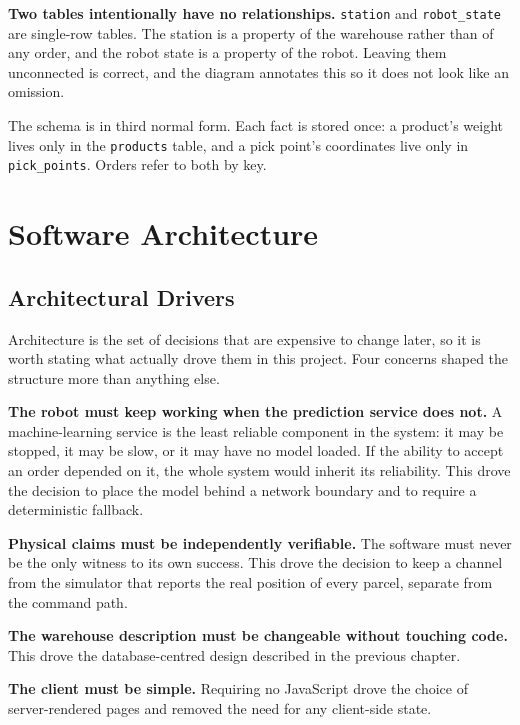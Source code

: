 \documentclass[12pt,a4paper]{report}
\newcommand{\code}[1]{\texttt{#1}}
\begin{document}
\textbf{Two tables intentionally have no relationships.} \code{station} and \code{robot\_state} are
single-row tables. The station is a property of the warehouse rather than of any order, and the
robot state is a property of the robot. Leaving them unconnected is correct, and the diagram
annotates this so it does not look like an omission.

The schema is in third normal form. Each fact is stored once: a product's weight lives only in the
\code{products} table, and a pick point's coordinates live only in \code{pick\_points}. Orders refer
to both by key.

\chapter{Software Architecture}
\label{ch:architecture}

\section{Architectural Drivers}
Architecture is the set of decisions that are expensive to change later, so it is worth stating
what actually drove them in this project. Four concerns shaped the structure more than anything
else.

\textbf{The robot must keep working when the prediction service does not.} A machine-learning
service is the least reliable component in the system: it may be stopped, it may be slow, or it may
have no model loaded. If the ability to accept an order depended on it, the whole system would
inherit its reliability. This drove the decision to place the model behind a network boundary and
to require a deterministic fallback.

\textbf{Physical claims must be independently verifiable.} The software must never be the only
witness to its own success. This drove the decision to keep a channel from the simulator that
reports the real position of every parcel, separate from the command path.

\textbf{The warehouse description must be changeable without touching code.} This drove the
database-centred design described in the previous chapter.

\textbf{The client must be simple.} Requiring no JavaScript drove the choice of server-rendered
pages and removed the need for any client-side state.
\end{document}

